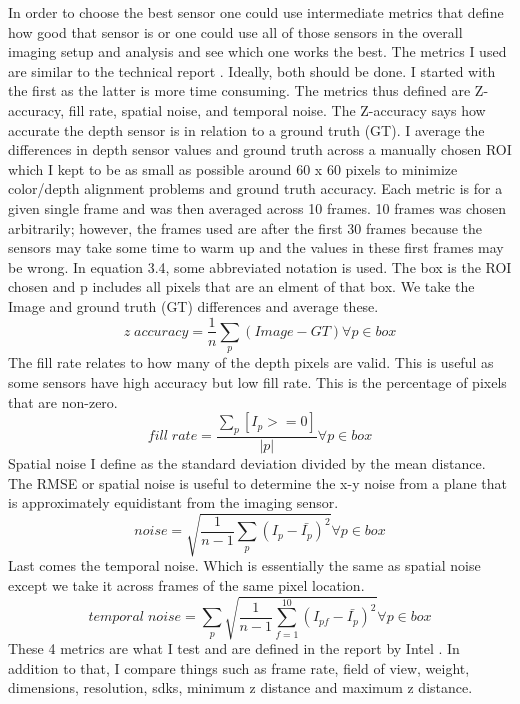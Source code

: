 In order to choose the best sensor one could use intermediate metrics that define how good that sensor is or one could use all of those sensors in the overall imaging setup and analysis and see which one works the best. The metrics I used are similar to the technical report \cite{depthtesting}. Ideally, both should be done. I started with the first as the latter is more time consuming. The metrics thus defined are Z-accuracy, fill rate, spatial noise, and temporal noise. The Z-accuracy says how accurate the depth sensor is in relation to a ground truth (GT). I average the differences in depth sensor values and ground truth across a manually chosen ROI which I kept to be as small as possible around 60 x 60 pixels to minimize color/depth alignment problems and ground truth accuracy. Each metric is for a given single frame and was then averaged across 10 frames. 10 frames was chosen arbitrarily; however, the frames used are after the first 30 frames because the sensors may take some time to warm up and the values in these first frames may be wrong. In equation 3.4, some abbreviated notation is used. The box is the ROI chosen and p includes all pixels that are an elment of that box. We take the Image and ground truth (GT) differences and average these.
\begin{equation}
	z \; accuracy = \frac{1}{n}\sum_p(Image - GT) \forall p \in box
\end{equation}
The fill rate relates to how many of the depth pixels are valid. This is useful as some sensors have high accuracy but low fill rate. This is the percentage of pixels that are non-zero.
\begin{equation}
	fill \; rate = \frac{\sum_p[I_p >= 0]}{\vert p \vert} \forall p \in box
\end{equation}
Spatial noise I define as the standard deviation divided by the mean distance.
The RMSE or spatial noise is useful to determine the x-y noise from a plane that is approximately equidistant from the imaging sensor.
\begin{equation}
	noise = \sqrt{\frac{1}{n-1}\sum_p(I_p-{\bar{I_p}})^2} \forall p \in box
\end{equation}
Last comes the temporal noise. Which is essentially the same as spatial noise except we take it across frames of the same pixel location.
\begin{equation}
	temporal \; noise = \sum_p\sqrt{\frac{1}{n-1}\sum_{f=1}^{10}(I_{pf}-\bar{I_p})^2} \forall p \in box
\end{equation}
These 4 metrics are what I test and are defined in the report by Intel \cite{depthtesting}. In addition to that, I compare things such as frame rate, field of view, weight, dimensions, resolution, sdks, minimum z distance and maximum z distance.

